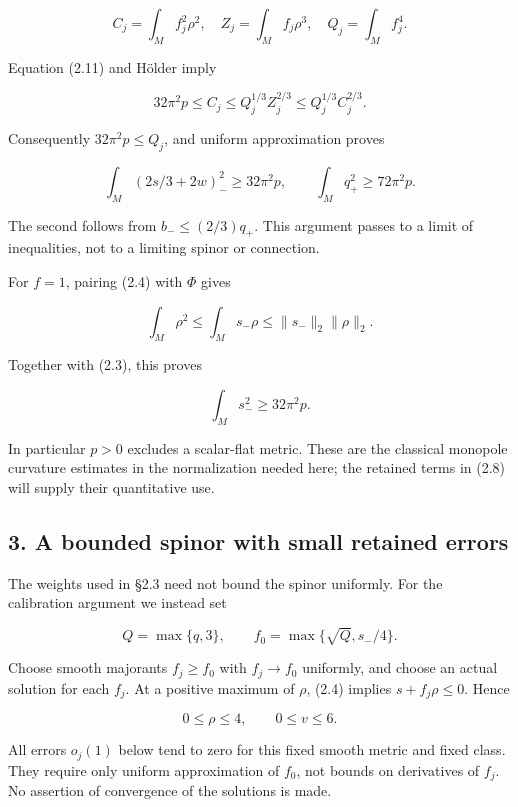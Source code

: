 \documentclass[
  10pt,
]{article}
\begin{document}
\[
 C_j=\int_M f_j^2\rho^2,\quad Z_j=\int_M f_j\rho^3,
 \quad Q_j=\int_M f_j^4.
\]

Equation (2.11) and Hölder imply

\[
 32\pi^2p\le C_j\le Q_j^{1/3}Z_j^{2/3}
                            \le Q_j^{1/3}C_j^{2/3}.
\]

Consequently \(32\pi^2p\le Q_j\), and uniform approximation proves

\[
 \int_M(2s/3+2w)_-^2\ge32\pi^2p,\qquad
 \int_M q_+^2\ge72\pi^2p.                               \tag{2.12}
\]

The second follows from \(b_-\le(2/3)q_+\). This argument passes to a
limit of inequalities, not to a limiting spinor or connection.

For \(f=1\), pairing (2.4) with \(\Phi\) gives

\[
 \int_M\rho^2\le\int_Ms_-\rho
        \le\|s_-\|_2\|\rho\|_2.
\]

Together with (2.3), this proves

\[
                        \int_Ms_-^2\ge32\pi^2p.          \tag{2.13}
\]

In particular \(p>0\) excludes a scalar-flat metric. These are the
classical monopole curvature estimates in the normalization needed here;
the retained terms in (2.8) will supply their quantitative use.

\hypertarget{a-bounded-spinor-with-small-retained-errors}{%
\subsection{3. A bounded spinor with small retained
errors}\label{a-bounded-spinor-with-small-retained-errors}}

The weights used in §2.3 need not bound the spinor uniformly. For the
calibration argument we instead set

\[
       Q=\max\{q,3\},\qquad
       f_0=\max\{\sqrt Q,s_-/4\}.                        \tag{3.1}
\]

Choose smooth majorants \(f_j\ge f_0\) with \(f_j\to f_0\) uniformly,
and choose an actual solution for each \(f_j\). At a positive maximum of
\(\rho\), (2.4) implies \(s+f_j\rho\le0\). Hence

\[
                           0\le\rho\le4,\qquad 0\le v\le6.
 \tag{3.2}
\]

All errors \(o_j(1)\) below tend to zero for this fixed smooth metric
and fixed class. They require only uniform approximation of \(f_0\), not
bounds on derivatives of \(f_j\). No assertion of convergence of the
solutions is made.
\end{document}
